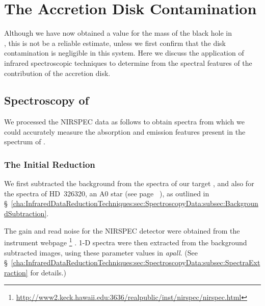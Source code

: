 
\chapter{The Accretion Disk Contamination}
\label{cha:AccretionDiskContamination}

Although we have now obtained a value for the mass of the black hole in \\%
\groj, this is not  be a reliable estimate, unless we first confirm that the disk contamination is negligible in this system. Here we discuss the application of infrared spectroscopic techniques to determine from the spectral features of \groj the contribution of the accretion disk. %


\section{Spectroscopy of \groj}
\label{cha:AccretionDiskContamination:sec:Spectroscopy}

We processed the NIRSPEC data as follows to obtain spectra from which we could accurately measure the absorption and emission features present in the spectrum of \groj. 


\subsection{The Initial Reduction}
\label{cha:AccretionDiskContamination:sec:Spectroscopy:subsec:InitialReduction}

We first subtracted the background from the spectra of our target \groj, and also for the spectra
of \mbox{HD 326320}, an A0 star (see page~%
\pageref{cha:GROJ1655-40:sec:ObservationsOfJ1655:subsec:DetailsOfTheObservations:subsubsec:2000Spectroscopy}%
), as outlined in \S~\ref{cha:InfraredDataReductionTechniques:sec:SpectroscopyData:subsec:BackgroundSubtraction}. %

\vspace{\myparskip}

The gain and read noise for the NIRSPEC detector were
obtained from the instrument webpage%
\footnote{%
\label{cha:AccretionDiskContamination:sec:Spectroscopy:subsec:InitialReduction:foot:Nirspec}
\url{http://www2.keck.hawaii.edu:3636/realpublic/inst/nirspec/nirspec.html} }%
. 1-D spectra were then extracted from the background subtracted images, using
these parameter values in \textit{apall}. (See \S~\ref{cha:InfraredDataReductionTechniques:sec:SpectroscopyData:subsec:SpectraExtraction} for details.) %

